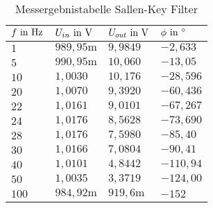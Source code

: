 \begin{table}[H]
\centering
\caption{Messergebnistabelle Sallen-Key Filter}
\label{tab:sallen_key_erg_table}
\begin{tabular}{|l|l|l|l|}
\hline
\rowcolor[HTML]{C0C0C0} 
$f\text{ in }\text{Hz}   $&$ U_{in}\text{ in }\text{V}       $&$ U_{out}\text{ in }\text{V}     $&$ \phi\text{ in }^\circ   $\\ \hline
$1   $&$ 989,95\text{m} $&$ 9,9849   $&$ -2,633  $\\ \hline
$5   $&$ 990,95\text{m} $&$ 10,060   $&$ -13,05  $\\ \hline
$10  $&$ 1,0030    $&$ 10,176   $&$ -28,596 $\\ \hline
$20  $&$ 1,0070    $&$ 9,3920   $&$ -60,436 $\\ \hline
$22  $&$ 1,0161    $&$ 9,0101   $&$ -67,267 $\\ \hline
$24  $&$ 1,0176    $&$ 8,5628   $&$ -73,690 $\\ \hline
$28  $&$ 1,0176    $&$ 7,5980   $&$ -85,40  $\\ \hline
$30  $&$ 1,0166    $&$ 7,0804   $&$ -90,41  $\\ \hline
$40  $&$ 1,0101    $&$ 4,8442   $&$ -110,94 $\\ \hline
$50  $&$ 1,0035    $&$ 3,3719   $&$ -124,00 $\\ \hline
$100 $&$ 984,92\text{m} $&$ 919,6\text{m} $&$ -152    $\\ \hline
\end{tabular}
\end{table}